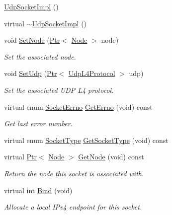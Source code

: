 \begin{DoxyCompactItemize}
\item 
\hyperlink{classns3_1_1UdpSocketImpl_a870b73927cd3bd748da198906b53fb2d}{Udp\+Socket\+Impl} ()
\item 
virtual \hyperlink{classns3_1_1UdpSocketImpl_a47080dd8189ab3065c5093470b123cec}{$\sim$\+Udp\+Socket\+Impl} ()
\item 
void \hyperlink{classns3_1_1UdpSocketImpl_abdbd6d194bd91c0c29f43698ddee2210}{Set\+Node} (\hyperlink{classns3_1_1Ptr}{Ptr}$<$ \hyperlink{classns3_1_1Node}{Node} $>$ node)
\begin{DoxyCompactList}\small\item\em Set the associated node. \end{DoxyCompactList}\item 
void \hyperlink{classns3_1_1UdpSocketImpl_a0138b99fbde4ea810ce1aa2e4500dff4}{Set\+Udp} (\hyperlink{classns3_1_1Ptr}{Ptr}$<$ \hyperlink{classns3_1_1UdpL4Protocol}{Udp\+L4\+Protocol} $>$ udp)
\begin{DoxyCompactList}\small\item\em Set the associated U\+DP L4 protocol. \end{DoxyCompactList}\item 
virtual enum \hyperlink{classns3_1_1Socket_ada1328c5ae0c28cb2a982caf8f6d6cca}{Socket\+Errno} \hyperlink{classns3_1_1UdpSocketImpl_ac8559811caa54f721de6f68bb030910f}{Get\+Errno} (void) const 
\begin{DoxyCompactList}\small\item\em Get last error number. \end{DoxyCompactList}\item 
virtual enum \hyperlink{classns3_1_1Socket_a698fbcc486a48b7a0d2b0e4ab863d571}{Socket\+Type} \hyperlink{classns3_1_1UdpSocketImpl_aea31312dc3090dbc0b629569bb2aba9b}{Get\+Socket\+Type} (void) const 
\item 
virtual \hyperlink{classns3_1_1Ptr}{Ptr}$<$ \hyperlink{classns3_1_1Node}{Node} $>$ \hyperlink{classns3_1_1UdpSocketImpl_ac0971130b8551291542586e2430410ff}{Get\+Node} (void) const 
\begin{DoxyCompactList}\small\item\em Return the node this socket is associated with. \end{DoxyCompactList}\item 
virtual int \hyperlink{classns3_1_1UdpSocketImpl_a02289f4c7fa69580c8426484fe3712c3}{Bind} (void)
\begin{DoxyCompactList}\small\item\em Allocate a local I\+Pv4 endpoint for this socket. \end{DoxyCompactList}\item 

\end{DoxyCompactItemize}
